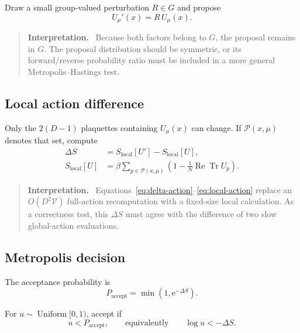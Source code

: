 \documentclass[11pt]{article}
\newcommand{\ReTr}{\operatorname{Re}\operatorname{Tr}}
\newcommand{\ee}{\mathrm{e}}
\newcommand{\Vlat}{\mathcal{V}}
\newenvironment{interpretation}
  {\begin{quote}\small\noindent\textbf{Interpretation.}\ }
  {\end{quote}}
\begin{document}
Draw a small group-valued perturbation \(R\in G\) and propose
\begin{equation}
  U_\mu'(x)=R\,U_\mu(x).
  \label{eq:proposal}
\end{equation}

\begin{interpretation}
Because both factors belong to \(G\), the proposal remains in \(G\). The
proposal distribution should be symmetric, or its forward/reverse probability
ratio must be included in a more general Metropolis--Hastings test.
\end{interpretation}

\subsection{Local action difference}

Only the \(2(D-1)\) plaquettes containing \(U_\mu(x)\) can change. If
\(\mathcal P(x,\mu)\) denotes that set, compute
\begin{align}
  \Delta S
  &=S_{\mathrm{local}}[U']-S_{\mathrm{local}}[U],
  \label{eq:delta-action}\\
  S_{\mathrm{local}}[U]
  &=\beta\sum_{p\in\mathcal P(x,\mu)}
  \left(1-\frac{1}{N}\ReTr U_p\right).
  \label{eq:local-action}
\end{align}

\begin{interpretation}
Equations~\eqref{eq:delta-action}--\eqref{eq:local-action} replace an
\(O(D^2\Vlat)\) full-action recomputation with a fixed-size local calculation.
As a correctness test, this \(\Delta S\) must agree with the difference of two
slow global-action evaluations.
\end{interpretation}

\subsection{Metropolis decision}

The acceptance probability is
\begin{equation}
  P_{\mathrm{accept}}=\min\left(1,\ee^{-\Delta S}\right).
  \label{eq:acceptance}
\end{equation}

For \(u\sim\operatorname{Uniform}[0,1)\), accept if
\begin{equation}
  u<P_{\mathrm{accept}},
  \qquad\text{equivalently}\qquad
  \log u<-\Delta S.
  \label{eq:log-acceptance}
\end{equation}
\end{document}
